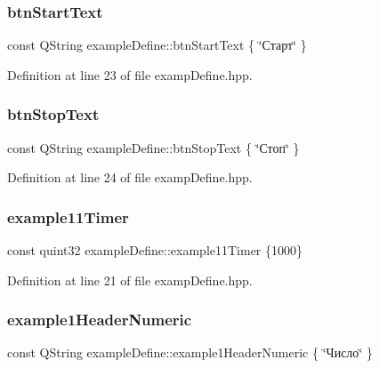 \subsubsection{\texorpdfstring{btn\+Start\+Text}{btnStartText}}
{\footnotesize\ttfamily const Q\+String example\+Define\+::btn\+Start\+Text \{ \char`\"{}Старт\char`\"{} \}}



Definition at line 23 of file examp\+Define.\+hpp.

\mbox{\label{namespaceexample_define_a3d39e835a9b4c6da21942d4d38a77a13}} 
\subsubsection{\texorpdfstring{btn\+Stop\+Text}{btnStopText}}
{\footnotesize\ttfamily const Q\+String example\+Define\+::btn\+Stop\+Text \{ \char`\"{}Стоп\char`\"{} \}}



Definition at line 24 of file examp\+Define.\+hpp.

\mbox{\label{namespaceexample_define_a0a1ec5a5c0128bb44325c0c336aada32}} 
\subsubsection{\texorpdfstring{example11\+Timer}{example11Timer}}
{\footnotesize\ttfamily const quint32 example\+Define\+::example11\+Timer \{1000\}}



Definition at line 21 of file examp\+Define.\+hpp.

\mbox{\label{namespaceexample_define_ab74bf03fd1beb4afeafb6f635b2b9702}} 
\subsubsection{\texorpdfstring{example1\+Header\+Numeric}{example1HeaderNumeric}}
{\footnotesize\ttfamily const Q\+String example\+Define\+::example1\+Header\+Numeric \{ \char`\"{}Число\char`\"{} \}}



